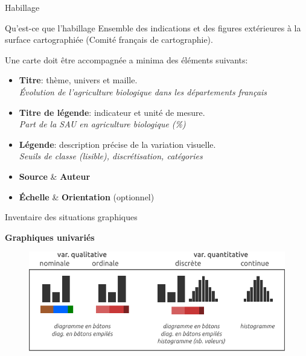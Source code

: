 \begin{frame}{Habillage}

\begin{block}{Qu'est-ce que l'habillage}
  Ensemble des indications et des figures extérieures à la surface cartographiée (Comité français de cartographie).
\end{block}

Une carte doit être accompagnée a minima des éléments suivants:
\begin{itemize}
  \item \textbf{Titre}: thème, univers et maille. \\ 
  \textit{Évolution de l'agriculture biologique dans les départements français}
  \item \textbf{Titre de légende}: indicateur et unité de mesure. \\
  \textit{Part de la SAU en agriculture biologique (\%)}
  \item \textbf{Légende}: description précise de la variation visuelle. \\
  \textit{Seuils de classe (lisible), discrétisation, catégories}
  \item \textbf{Source} \& \textbf{Auteur}
  \item \textbf{Échelle} \& \textbf{Orientation} (optionnel)
\end{itemize}

\end{frame}


\begin{frame}{Inventaire des situations graphiques}

\textbf{Graphiques univariés}

\begin{figure}
\includegraphics[width=11.5cm]{TableauGraphique.pdf}
\end{figure}

\end{frame}


